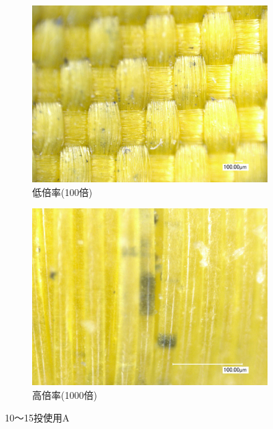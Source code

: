 \documentclass[main]{subfiles}
\begin{document}
\begin{figure}[H]
    \centering
    \begin{subfigure}[htbp]{0.45\linewidth}
        \centering
        \includegraphics[keepaspectratio, width=0.8\linewidth]{figures/縁/カーリングパッド10-15低倍率.jpg}
        \caption{低倍率(100倍)}
        \label{fig:label}
    \end{subfigure}
    \begin{subfigure}[htbp]{0.45\linewidth}
        \centering
        \includegraphics[keepaspectratio, width=0.8\linewidth]{figures/縁/カーリングパッド10-15.jpg}
        \caption{高倍率(1000倍)}
        \label{fig:label}
    \end{subfigure}
    \caption{10～15投使用A}
    \label{fig:label}
\end{figure}
    
\end{document}

